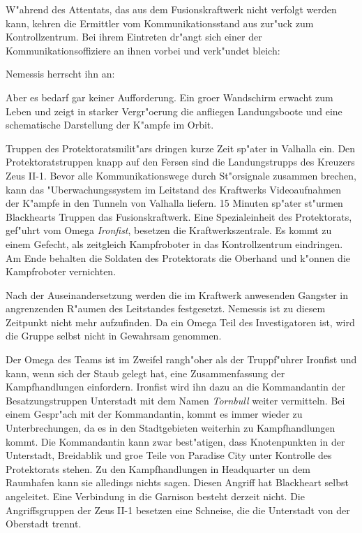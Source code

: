 
W"ahrend des Attentats, das aus dem Fusionskraftwerk nicht verfolgt werden kann, kehren die Ermittler vom Kommunikationsstand aus zur"uck zum Kontrollzentrum. Bei ihrem Eintreten dr"angt sich einer der Kommunikationsoffiziere an ihnen vorbei und verk"undet bleich:

 Nemessis herrscht ihn an: 

Aber es bedarf gar keiner Aufforderung. Ein gro\3er Wandschirm erwacht zum Leben und zeigt in starker Vergr"o\3erung die anfliegen Landungsboote und eine schematische Darstellung der K"ampfe im Orbit.

Truppen des Protektoratsmilit"ars dringen kurze Zeit sp"ater in Valhalla ein. Den Protektoratstruppen knapp auf den Fersen sind die Landungstrupps des Kreuzers Zeus II-1. Bevor alle Kommunikationswege durch St"orsignale zusammen brechen, kann das "Uberwachungssystem im Leitstand des Kraftwerks Videoaufnahmen der K"ampfe in den Tunneln von Valhalla liefern. 15 Minuten sp"ater st"urmen Blackhearts Truppen das Fusionskraftwerk. Eine Spezialeinheit des Protektorats, gef"uhrt vom Omega \emph{Ironfist}, besetzen die Kraftwerkszentrale. Es kommt zu einem Gefecht, als zeitgleich Kampfroboter in das Kontrollzentrum eindringen. Am Ende behalten die Soldaten des Protektorats die Oberhand und k"onnen die Kampfroboter vernichten. 

Nach der Auseinandersetzung werden die im Kraftwerk anwesenden Gangster in angrenzenden R"aumen des Leitstandes festgesetzt. Nemessis ist zu diesem Zeitpunkt nicht mehr aufzufinden. Da ein Omega Teil des Investigatoren ist, wird die Gruppe selbst nicht in Gewahrsam genommen. 

Der Omega des Teams ist im Zweifel rangh"oher als der Truppf"uhrer Ironfist und kann, wenn sich der Staub gelegt hat, eine Zusammenfassung der Kampfhandlungen einfordern. Ironfist wird ihn dazu an die Kommandantin der Besatzungstruppen Unterstadt mit dem Namen \emph{Tornbull} weiter vermitteln. Bei einem Gespr"ach mit der Kommandantin, kommt es immer wieder zu Unterbrechungen, da es in den Stadtgebieten weiterhin zu Kampfhandlungen kommt. Die Kommandantin kann zwar best"atigen, dass Knotenpunkten in der Unterstadt, Breidablik und gro\3e Teile von Paradise City unter Kontrolle des Protektorats stehen. Zu den Kampfhandlungen in Headquarter un dem Raumhafen kann sie alledings nichts sagen. Diesen Angriff hat Blackheart selbst angeleitet. Eine Verbindung in die Garnison besteht derzeit nicht. Die Angriffsgruppen der Zeus II-1 besetzen eine Schneise, die die Unterstadt von der Oberstadt trennt.


